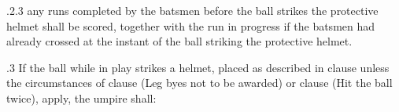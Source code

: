 \documentclass[12pt]{article}
\begin{document}
\vspace{\baselineskip}
\begin{adjustwidth}{1.18in}{0.01in}
{\fontsize{9pt}{10.8pt}.2.3 \tabto{1.17in} any runs completed by the batsmen before the ball strikes the protective helmet shall be scored, together with the run in progress if the batsmen had already crossed at the instant of the ball striking the protective helmet.\par}\par

\end{adjustwidth}


\vspace{\baselineskip}

\vspace{\baselineskip}

\vspace{\baselineskip}

\vspace{\baselineskip}

\vspace{\baselineskip}

\vspace{\baselineskip}
\begin{Center}
{\fontsize{8pt}{9.6pt}\par}
\end{Center}\par


\vspace{\baselineskip}

\vspace{\baselineskip}
\begin{adjustwidth}{0.5in}{0.17in}
{\fontsize{9pt}{10.8pt}.3 \tabto{0.49in} If the ball while in play strikes a helmet, placed as described in clause unless the circumstances of clause (Leg byes not to be awarded) or clause (Hit the ball twice), apply, the umpire shall:\par}\par

\end{adjustwidth}
\end{document}
